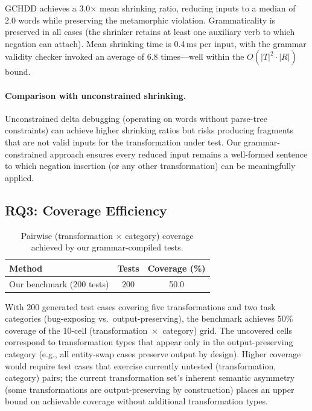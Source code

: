 \documentclass[sigconf,nonacm]{acmart}
\begin{document}
GCHDD achieves a 3.0$\times$ mean shrinking ratio, reducing inputs to a median of 2.0 words while preserving the metamorphic violation.
Grammaticality is preserved in all cases (the shrinker retains at least one auxiliary verb to which negation can attach).
Mean shrinking time is 0.4\,ms per input, with the grammar validity checker invoked an average of 6.8 times---well within the $O(|T|^2 \cdot |R|)$ bound.

\paragraph{Comparison with unconstrained shrinking.}
Unconstrained delta debugging (operating on words without parse-tree constraints) can achieve higher shrinking ratios but risks producing fragments that are not valid inputs for the transformation under test.
Our grammar-constrained approach ensures every reduced input remains a well-formed sentence to which negation insertion (or any other transformation) can be meaningfully applied.

\subsection{RQ3: Coverage Efficiency}

\begin{table}[t]
\centering
\caption{Pairwise (transformation $\times$ category) coverage achieved by our grammar-compiled tests.}
\label{tab:coverage}
\begin{tabular}{@{}lcc@{}}
\toprule
\textbf{Method} & \textbf{Tests} & \textbf{Coverage (\%)} \\
\midrule
Our benchmark (200 tests) & 200 & 50.0 \\
\bottomrule
\end{tabular}
\end{table}

With 200 generated test cases covering five transformations and two task categories (bug-exposing vs.\ output-preserving), the benchmark achieves 50\% coverage of the 10-cell (transformation~$\times$~category) grid.
The uncovered cells correspond to transformation types that appear only in the output-preserving category (e.g., all entity-swap cases preserve output by design).
Higher coverage would require test cases that exercise currently untested (transformation, category) pairs; the current transformation set's inherent semantic asymmetry (some transformations are output-preserving by construction) places an upper bound on achievable coverage without additional transformation types.
\end{document}

